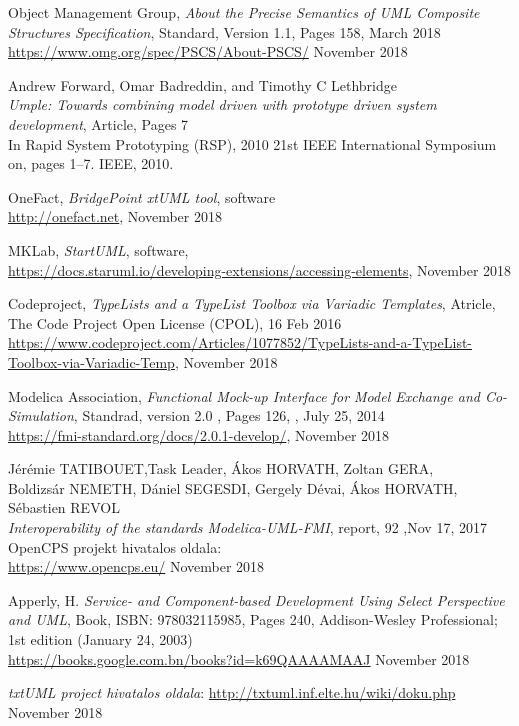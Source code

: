 \documentclass[a4paper,12pt]{report}
\begin{document}
\begin{thebibliography}{4}
	Object Management Group, \emph{About the Precise Semantics of UML Composite Structures Specification}, Standard, Version 1.1, Pages 158, March 2018\\
	\url{https://www.omg.org/spec/PSCS/About-PSCS/} November 2018
	
	Andrew Forward, Omar Badreddin, and Timothy C Lethbridge \\
	\emph{Umple: Towards combining model driven with prototype driven system development}, Article, Pages 7 \\
	In Rapid System Prototyping (RSP), 2010 21st IEEE International Symposium on, pages 1–7. IEEE, 2010.

	OneFact, \emph{BridgePoint xtUML tool}, software \\
	\url{http://onefact.net}, November 2018
	
	MKLab,  \emph{StartUML}, software, \\
	\url{https://docs.staruml.io/developing-extensions/accessing-elements}, November 2018
	
	Codeproject, \emph{TypeLists and a TypeList Toolbox via Variadic Templates}, Atricle,  The Code Project Open License (CPOL), 16 Feb 2016
	\url{https://www.codeproject.com/Articles/1077852/TypeLists-and-a-TypeList-Toolbox-via-Variadic-Temp},
	November 2018
	
	Modelica Association, 
	\emph{Functional Mock-up Interface for Model Exchange and Co-Simulation}, 
	Standrad, version 2.0 , Pages 126, , July 25, 2014  \\
	\url{https://fmi-standard.org/docs/2.0.1-develop/}, November 2018
	
	Jérémie TATIBOUET,Task Leader, Ákos HORVATH, Zoltan GERA, \\
	Boldizsár NEMETH, Dániel SEGESDI, Gergely Dévai, Ákos HORVATH, Sébastien REVOL \\
	\emph{Interoperability of the standards Modelica-UML-FMI}, report, 92 ,Nov 17, 2017 \\
	
	OpenCPS projekt hivatalos oldala: \\
	\url{https://www.opencps.eu/} November 2018
	
  Apperly, H.
  \emph{Service- and Component-based Development Using Select Perspective and UML}, Book, ISBN: 978032115985, Pages 240, Addison-Wesley Professional; 1st edition (January 24, 2003) \\
  \url{https://books.google.com.bn/books?id=k69QAAAAMAAJ} November 2018
  
	\emph{txtUML project hivatalos oldala}: \url{http://txtuml.inf.elte.hu/wiki/doku.php} November 2018
	
	
\end{thebibliography}
\end{document}
